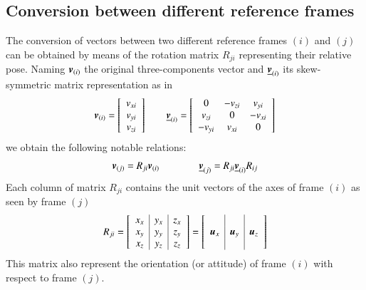 \subsection{Conversion between different reference frames}
\label{app:RotatMatrix1}
The conversion of vectors between two different reference frames $(i)$ and $(j)$ can be obtained by means of the rotation matrix $R_{ji}$ representing their relative pose. Naming ${\boldsymbol{v}}_{(i)}$ the original three-components vector and $\underline{{\boldsymbol{v}}}_{(i)}$ its skew-symmetric matrix representation as in
\begin{equation}
    {\boldsymbol{v}}_{(i)} = \left[
    \begin{array}{c}
            v_{xi} \\
            v_{yi} \\
            v_{zi} \\
    \end{array}
    \right] \qquad {\underline{{\boldsymbol{v}}}_{(i)}} = \left[
    \begin{array}{ccc}
            0 & -v_{zi} & v_{yi} \\
            v_{zi} & 0 & -v_{xi} \\
            -v_{yi} & v_{xi} & 0 \\
    \end{array}
    \right]
    \label{eq:VV_}
\end{equation}
we obtain the following notable relations:
\begin{equation}
    {\boldsymbol{v}}_{(j)} = R_{ji} {\boldsymbol{v}}_{(i)} \qquad\qquad \underline{{\boldsymbol{v}}}_{(j)} = R_{ji} \underline{{\boldsymbol{v}}}_{(i)} R_{ij}
    \label{eq:cambioRif}
\end{equation}
Each column of matrix $R_{ji}$ contains the unit vectors of the axes of frame  $(i)$ as seen by frame $(j)$
\begin{equation}
    R_{ji} = \left[
    \begin{array}{c|c|c}
        x_{x} & y_{x} & z_{x} \\
        x_{y} & y_{y} & z_{y} \\
        x_{z} & y_{z} & z_{z} \\
    \end{array}
    \right]
     = \left[
    \begin{array}{c|c|c}
         &  &  \\
        {\boldsymbol{u}}_x & {\boldsymbol{u}}_y & {\boldsymbol{u}}_z \\
         &  & \\
    \end{array}
    \right]
    \label{eq:column}
\end{equation}
This matrix also represent the orientation (or attitude) of frame $(i)$ with respect to frame $(j)$.

